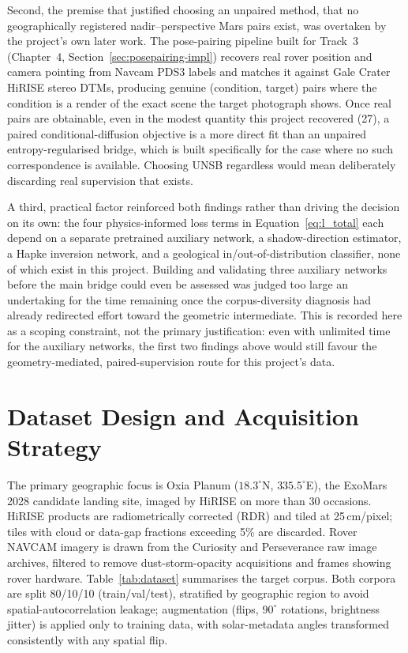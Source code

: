 Second, the premise that justified choosing an unpaired method, that no geographically registered nadir--perspective Mars pairs exist, was overtaken by the project's own later work. The pose-pairing pipeline built for Track~3 (Chapter~4, Section~\ref{sec:posepairing-impl}) recovers real rover position and camera pointing from Navcam PDS3 labels and matches it against Gale Crater HiRISE stereo DTMs, producing genuine (condition, target) pairs where the condition is a render of the exact scene the target photograph shows. Once real pairs are obtainable, even in the modest quantity this project recovered (27), a paired conditional-diffusion objective is a more direct fit than an unpaired entropy-regularised bridge, which is built specifically for the case where no such correspondence is available. Choosing UNSB regardless would mean deliberately discarding real supervision that exists.

A third, practical factor reinforced both findings rather than driving the decision on its own: the four physics-informed loss terms in Equation~\ref{eq:l_total} each depend on a separate pretrained auxiliary network, a shadow-direction estimator, a Hapke inversion network, and a geological in/out-of-distribution classifier, none of which exist in this project. Building and validating three auxiliary networks before the main bridge could even be assessed was judged too large an undertaking for the time remaining once the corpus-diversity diagnosis had already redirected effort toward the geometric intermediate. This is recorded here as a scoping constraint, not the primary justification: even with unlimited time for the auxiliary networks, the first two findings above would still favour the geometry-mediated, paired-supervision route for this project's data.

\section{Dataset Design and Acquisition Strategy}
\label{sec:datasets}

The primary geographic focus is Oxia Planum ($18.3^{\circ}$N, $335.5^{\circ}$E), the ExoMars 2028 candidate landing site, imaged by HiRISE on more than 30 occasions. HiRISE products are radiometrically corrected (RDR) and tiled at 25\,cm/pixel; tiles with cloud or data-gap fractions exceeding 5\% are discarded. Rover NAVCAM imagery is drawn from the Curiosity and Perseverance raw image archives, filtered to remove dust-storm-opacity acquisitions and frames showing rover hardware. Table~\ref{tab:dataset} summarises the target corpus. Both corpora are split 80/10/10 (train/val/test), stratified by geographic region to avoid spatial-autocorrelation leakage; augmentation (flips, $90^{\circ}$ rotations, brightness jitter) is applied only to training data, with solar-metadata angles transformed consistently with any spatial flip.

